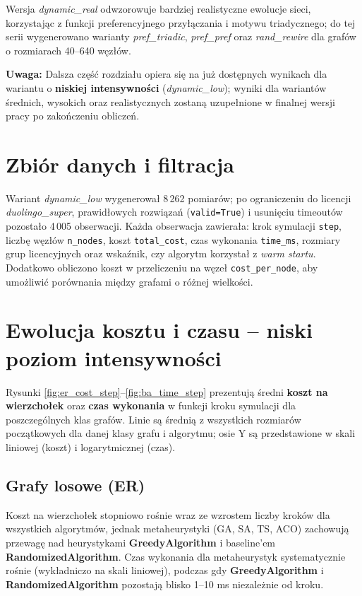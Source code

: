 Wersja \emph{dynamic\_real} odwzorowuje bardziej realistyczne ewolucje sieci, korzystając z funkcji preferencyjnego przyłączania i motywu triadycznego; do tej serii wygenerowano warianty \emph{pref\_triadic}, \emph{pref\_pref} oraz \emph{rand\_rewire} dla grafów o rozmiarach 40--640 węzłów.

\textbf{Uwaga:} Dalsza część rozdziału opiera się na już dostępnych wynikach dla wariantu o \textbf{niskiej intensywności} (\emph{dynamic\_low}); wyniki dla wariantów średnich, wysokich oraz realistycznych zostaną uzupełnione w finalnej wersji pracy po zakończeniu obliczeń.

\section{Zbiór danych i filtracja}

Wariant \emph{dynamic\_low} wygenerował 8\,262 pomiarów; po ograniczeniu do licencji \emph{duolingo\_super}, prawidłowych rozwiązań (\texttt{valid=True}) i usunięciu timeoutów pozostało 4\,005 obserwacji. Każda obserwacja zawierała: krok symulacji \texttt{step}, liczbę węzłów \texttt{n\_nodes}, koszt \texttt{total\_cost}, czas wykonania \texttt{time\_ms}, rozmiary grup licencyjnych oraz wskaźnik, czy algorytm korzystał z \emph{warm startu}. Dodatkowo obliczono koszt w przeliczeniu na węzeł \texttt{cost\_per\_node}, aby umożliwić porównania między grafami o różnej wielkości.

\section{Ewolucja kosztu i czasu -- niski poziom intensywności}

Rysunki \ref{fig:er_cost_step}--\ref{fig:ba_time_step} prezentują średni \textbf{koszt na wierzchołek} oraz \textbf{czas wykonania} w funkcji kroku symulacji dla poszczególnych klas grafów. Linie są średnią z wszystkich rozmiarów początkowych dla danej klasy grafu i algorytmu; osie Y są przedstawione w skali liniowej (koszt) i logarytmicznej (czas).

\subsection{Grafy losowe (ER)}

Koszt na wierzchołek stopniowo rośnie wraz ze wzrostem liczby kroków dla wszystkich algorytmów, jednak metaheurystyki (GA, SA, TS, ACO) zachowują przewagę nad heurystykami \textbf{GreedyAlgorithm} i baseline'em \textbf{RandomizedAlgorithm}. Czas wykonania dla metaheurystyk systematycznie rośnie (wykładniczo na skali liniowej), podczas gdy \textbf{GreedyAlgorithm} i \textbf{RandomizedAlgorithm} pozostają blisko 1--10 ms niezależnie od kroku.


